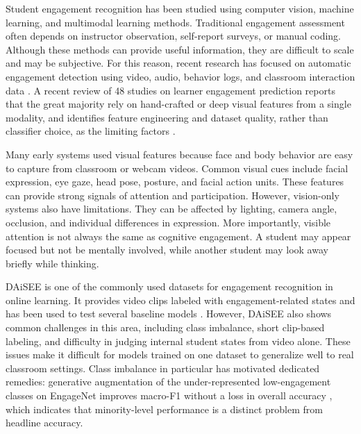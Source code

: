 \documentclass[journal]{IEEEtran}
\begin{document}
Student engagement recognition has been studied using computer vision, machine learning, and multimodal learning methods. Traditional engagement assessment often depends on instructor observation, self-report surveys, or manual coding. Although these methods can provide useful information, they are difficult to scale and may be subjective. For this reason, recent research has focused on automatic engagement detection using video, audio, behavior logs, and classroom interaction data \cite{qarbal2025review,theophilus2026review}. A recent review of 48 studies on learner engagement prediction reports that the great majority rely on hand-crafted or deep visual features from a single modality, and identifies feature engineering and dataset quality, rather than classifier choice, as the limiting factors \cite{theophilus2026review}.

Many early systems used visual features because face and body behavior are easy to capture from classroom or webcam videos. Common visual cues include facial expression, eye gaze, head pose, posture, and facial action units. These features can provide strong signals of attention and participation. However, vision-only systems also have limitations. They can be affected by lighting, camera angle, occlusion, and individual differences in expression. More importantly, visible attention is not always the same as cognitive engagement. A student may appear focused but not be mentally involved, while another student may look away briefly while thinking.

DAiSEE is one of the commonly used datasets for engagement recognition in online learning. It provides video clips labeled with engagement-related states and has been used to test several baseline models \cite{gupta2016daisee}. However, DAiSEE also shows common challenges in this area, including class imbalance, short clip-based labeling, and difficulty in judging internal student states from video alone. These issues make it difficult for models trained on one dataset to generalize well to real classroom settings. Class imbalance in particular has motivated dedicated remedies: generative augmentation of the under-represented low-engagement classes on EngageNet improves macro-F1 without a loss in overall accuracy \cite{yulius2025gan}, which indicates that minority-level performance is a distinct problem from headline accuracy.
\end{document}
